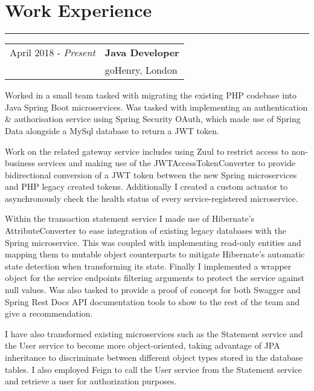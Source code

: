 \section*{\color{Maroon}Work Experience}
\hrule \smallskip
\noindent
\begin{flushleft}
\begin{tabular}{r|l}
\indent April 2018 - \textit{Present} & \textbf{Java Developer} \\
\indent & {\large{goHenry, London}} \\
\end{tabular}
\end{flushleft}
Worked in a small team tasked with migrating the existing PHP codebase into Java Spring Boot microservices. Was tasked with implementing an authentication \& authorisation service using Spring Security OAuth, which made use of Spring Data alongside a MySql database to return a JWT token. \newline

Work on the related gateway service includes using Zuul to restrict access to non-business services and making use of the JWTAccessTokenConverter to provide bidirectional conversion of a JWT token between the new Spring microservices and PHP legacy created tokens. Additionally I created a custom actuator to asynchronously check the health status of every service-registered microservice.\newline

Within the transaction statement service I made use of Hibernate's AttributeConverter to ease integration of existing legacy databases with the Spring microservice. This was coupled with implementing read-only entities and mapping them to mutable object counterparts to mitigate Hibernate's automatic state detection when transforming its state. Finally I implemented a wrapper object for the service endpoints filtering arguments to protect the service against null values. Was also tasked to provide a proof of concept for both Swagger and Spring Rest Docs API documentation tools to show to the rest of the team and give a recommendation.\newline

I have also transformed existing microservices such as the Statement service and the User service to become more object-oriented, taking advantage of JPA inheritance to discriminate between different object types stored in the database tables. I also employed Feign to call the User service from the Statement service and retrieve a user for authorization purposes. \newline  

